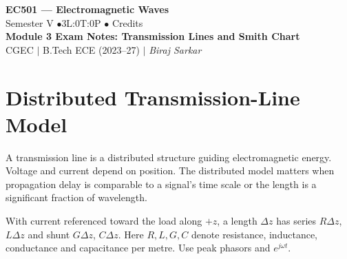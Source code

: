 \documentclass[12pt,a4paper]{article}
\begin{document}

\begin{center}
  {\LARGE\bfseries\color{myred} EC501 --- Electromagnetic Waves}\\[5pt]
  {\normalsize\color{mydark} Semester V \quad$\bullet$\quad 3L:0T:0P \quad$\bullet$ Credits}\\[3pt]
  {\normalsize\color{myteal}\textbf{Module 3 Exam Notes: Transmission Lines and Smith Chart}}\\[3pt]
  {\small\color{mydark} CGEC \;$|$\; B.Tech ECE (2023--27) \;$|$\; \textit{Biraj Sarkar}}
\end{center}
\vspace{2pt}
\noindent{\color{myred}\rule{\linewidth}{1.5pt}}
\vspace{2pt}

\hypersetup{linkcolor=mydark}
\tableofcontents
\hypersetup{linkcolor=myteal}
\newpage

\section{Distributed Transmission-Line Model}
\begin{tcolorbox}[defbox,title={Transmission line}]
A transmission line is a distributed structure guiding electromagnetic energy. Voltage and current depend on position. The distributed model matters when propagation delay is comparable to a signal's time scale or the length is a significant fraction of wavelength.
\end{tcolorbox}

With current referenced toward the load along $+z$, a length $\Delta z$ has series $R\Delta z$, $L\Delta z$ and shunt $G\Delta z$, $C\Delta z$. Here $R,L,G,C$ denote resistance, inductance, conductance and capacitance per metre. Use peak phasors and $e^{j\omega t}$.
\begin{tcolorbox}[tikzbox,title={Incremental line section},unbreakable]
\centering
{}
\end{tcolorbox}
\end{document}
